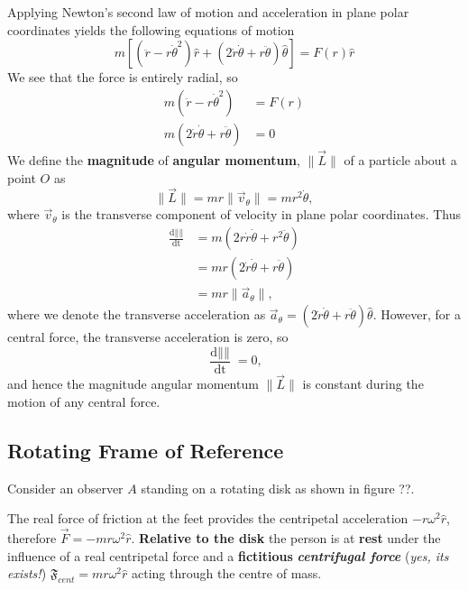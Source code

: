 Applying Newton's second law of motion and acceleration in plane polar coordinates yields the following equations of motion
\begin{equation}
    m\left[\left(\ddot{r} - r \dot{\theta}^2\right)\hat{r} + \left(2 \dot{r} \dot{\theta} + r \ddot{\theta}\right)\hat{\theta}\right] = F(r)\hat{r}
\end{equation}
We see that the force is entirely radial, so
\begin{align}
    m\left(\ddot{r} - r\dot{\theta}^2\right) &= F(r) \\
    m(2\dot{r}\dot{\theta} + r\ddot{\theta}) &= 0
\end{align}
We define the \textbf{magnitude} of \textbf{angular momentum}, $\| \vec{L} \|$ of a particle about a point $O$ as
\begin{equation}
    \| \vec{L} \| = mr \| \vec{v}_{\theta} \| = mr^2 \dot{\theta},
\end{equation}
where $\vec{v}_{\theta}$ is the transverse component of velocity in plane polar coordinates. Thus
\begin{align}
    \frac{\mathop{\mathrm{d}\| \vec{L} \|}}{\mathop{\mathrm{d}t}} &= m\left(2 r \dot{r} \dot{\theta} + r^2 \ddot{\theta}\right) \\
    &= mr\left(2\dot{r}\dot{\theta} + r \ddot{\theta}\right) \\
    &= mr\| \vec{a}_{\theta} \|,
\end{align}
where we denote the transverse acceleration as $\vec{a}_{\theta} = \left(2\dot{r}\dot{\theta} + r \ddot{\theta}\right) \hat{\theta}$. However, for a central force, the transverse acceleration is zero, so
\begin{equation}
    \frac{\mathop{\mathrm{d}\| \vec{L} \|}}{\mathop{\mathrm{d}t}} = 0,
\end{equation}
and hence the magnitude angular momentum $\| \vec{L} \|$ is constant during the motion of any central force.

\subsection{Rotating Frame of Reference}

Consider an observer $A$ standing on a rotating disk as shown in figure ??. 

The real force of friction at the feet provides the centripetal acceleration $-r\omega^2 \hat{r}$, therefore $\vec{F} = -mr\omega^2\hat{r}$. \textbf{Relative to the disk} the person is at \textbf{rest} under the influence of a real centripetal force and a \textbf{fictitious} \textbf{\textit{centrifugal force}} (\textit{yes, its exists!}) $\mathfrak{F}_{cent} = mr\omega^2\hat{r}$ acting through the centre of mass. 

